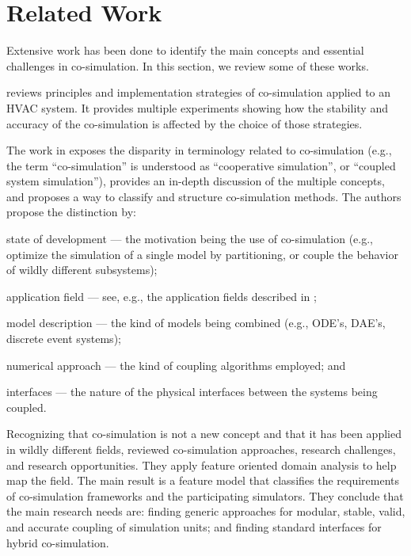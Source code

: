 
\section{Related Work}\label{sec:related}

Extensive work has been done to identify the main concepts and essential challenges in co-simulation.
In this section, we review some of these works.

\cite{Trcka2007} reviews principles and implementation strategies of co-simulation applied to an HVAC system.
It provides multiple experiments showing how the stability and accuracy of the co-simulation is affected by the choice of those strategies.

The work in \cite{Hafner2017} exposes the disparity in terminology related to co-simulation (e.g., the term ``co-simulation'' is understood as ``cooperative simulation'', or ``coupled system simulation''), provides an in-depth discussion of the multiple concepts, and proposes a way to classify and structure co-simulation methods.
The authors propose the distinction by:
\begin{compactdesc}
\item[state of development] --- the motivation being the use of co-simulation (e.g., optimize the simulation of a single model by partitioning, or couple the behavior of wildly different subsystems);
\item[application field] --- see, e.g., the application fields described in \cite{Gomes2017};
\item[model description] --- the kind of models being combined (e.g., ODE's, DAE's, discrete event systems);
\item[numerical approach] --- the kind of coupling algorithms employed; and
\item[interfaces] --- the nature of the physical interfaces between the systems being coupled.
\end{compactdesc}

Recognizing that co-simulation is not a new concept and that it has been applied in wildly different fields, \cite{Gomes2018} reviewed co-simulation approaches, research challenges, and research opportunities. 
They apply feature oriented domain analysis \cite{Kang1990} to help map the field. 
The main result is a feature model that classifies the requirements of co-simulation frameworks and the participating simulators. 
They conclude that the main research needs are: finding generic approaches for modular, stable, valid, and accurate coupling of simulation units; and finding standard interfaces for hybrid co-simulation. 

